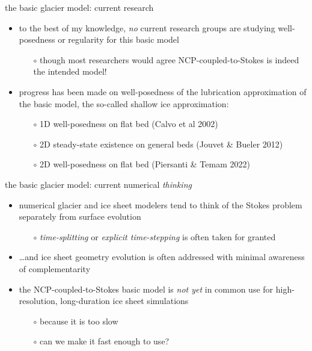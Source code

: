 \documentclass[svgnames,
               hyperref={colorlinks,citecolor=DeepPink4,linkcolor=FireBrick,urlcolor=Maroon},
               usepdftitle=false]  %
               {beamer}
\begin{document}
\begin{frame}{the basic glacier model: current research}

\begin{itemize}
\item to the best of my knowledge, \emph{no} current research groups are studying well-posedness or regularity for this basic model
    \begin{itemize}
    \item[$\circ$] though most researchers would agree NCP-coupled-to-Stokes is indeed the intended model!
    \end{itemize}

\medskip
\item<2> progress has been made on well-posedness of the lubrication approximation of the basic model, the so-called \alert{shallow ice approximation}:
    \begin{itemize}
    \item[$\circ$] 1D well-posedness on flat bed (Calvo et al 2002)
    \item[$\circ$] 2D steady-state existence on general beds (Jouvet \& Bueler 2012)
    \item[$\circ$] 2D well-posedness on flat bed (Piersanti \& Temam 2022)
    \end{itemize}
\end{itemize}
\end{frame}


\begin{frame}{the basic glacier model: current numerical \emph{thinking}}

\begin{itemize}
\item numerical glacier and ice sheet modelers tend to think of the Stokes problem separately from surface evolution
    \begin{itemize}
    \item[$\circ$] \emph{time-splitting} or \emph{explicit time-stepping} is often taken for granted
    \end{itemize}

\medskip
\item \dots and ice sheet geometry evolution is often addressed with minimal awareness of complementarity

\medskip
\item<2> the NCP-coupled-to-Stokes basic model is \emph{not yet} in common use for high-resolution, long-duration ice sheet simulations
    \begin{itemize}
    \item[$\circ$] because it is too slow
    \item[$\circ$] \alert{can we make it fast enough to use?} \hfill \begin{minipage}{0.3\textwidth}{\footnotesize {}} \end{minipage}
    \end{itemize}
\end{itemize}
\end{frame}
\end{document}
